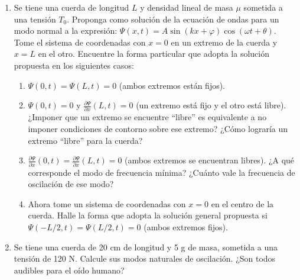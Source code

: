 \documentclass[11pt,spanish]{article}
\begin{document}
\begin{enumerate}

\section*{Condiciones de contorno en cuerdas y tubos}


    \item Se tiene una cuerda de longitud $L$ y densidad lineal de masa $\mu$
    sometida a una tensión $T_{0}$. Proponga como solución de la ecuación
    de ondas para un modo normal a la expresión:
    $\Psi(x,t)=A\sin(kx+\varphi)\cos(\omega t+\theta)$. Tome el sistema de
    coordenadas con $x=0$ en un extremo de la cuerda y $x=L$ en el otro.
    Encuentre la forma particular que adopta la solución propuesta en los
    siguientes casos: 

    \begin{enumerate}
        \item $\Psi(0,t)=\Psi(L,t)=0$ (ambos extremos están fijos).

        \item $\Psi(0,t)=0$ y $\frac{\partial\Psi}{\partial x}(L,t)=0$ (un
        extremo está fijo y el otro está libre). ¿Imponer que un extremo se
        encuentre ``libre'' es equivalente a no imponer condiciones de contorno
        sobre ese extremo? ¿Cómo lograría un extremo ``libre'' para la cuerda? 

        \item $\frac{\partial\Psi}{\partial x}(0,t)=\frac{\partial\Psi}{\partial x}(L,t)=0$
        (ambos extremos se encuentran libres). ¿A qué corresponde el modo de
        frecuencia mínima? ¿Cuánto vale la frecuencia de oscilación de ese modo?

        \item Ahora tome un sistema de coordenadas con $x=0$ en el centro de la
        cuerda. Halle la forma que adopta la solución general propuesta si
        $\Psi(-L/2,t)=\Psi(L/2,t)=0$ (ambos extremos fijos).

    \end{enumerate}


    \item Se tiene una cuerda de 20 cm de longitud y 5 g de masa, sometida a
    una tensión de 120 N. Calcule sus modos naturales de oscilación. ¿Son todos
    audibles para el oído humano?


\end{enumerate}
\end{document}
